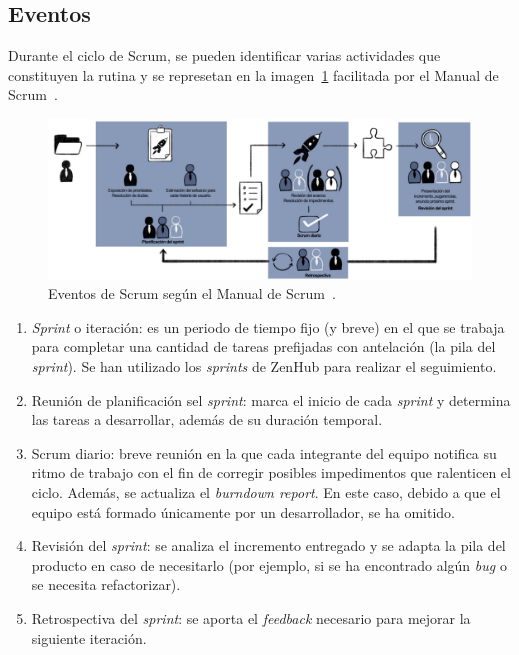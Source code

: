 \subsection{Eventos}
Durante el ciclo de Scrum, se pueden identificar varias actividades que constituyen la rutina y se represetan en la imagen~\ref{img:eventos_scrum} facilitada por el Manual de Scrum~\cite{scrumMaster2022}.

\begin{figure}[h]
	\caption[Eventos de Scrum]{Eventos de Scrum según el Manual de Scrum~\cite{scrumMaster2022}.}
	\label{img:eventos_scrum}
	\centering
	\includegraphics[width=\textwidth]{../img/anexos/scrum/eventos}
\end{figure}

\begin{enumerate}
	\item \textit{Sprint} o iteración: es un periodo de tiempo fijo (y breve) en el que se trabaja para completar una cantidad de tareas prefijadas con antelación (la pila del \textit{sprint}). Se han utilizado los \textit{sprints} de ZenHub para realizar el seguimiento.
	\item Reunión de planificación sel \textit{sprint}: marca el inicio de cada \textit{sprint} y determina las tareas a desarrollar, además de su duración temporal.
	\item Scrum diario: breve reunión en la que cada integrante del equipo notifica su ritmo de trabajo con el fin de corregir posibles impedimentos que ralenticen el ciclo. Además, se actualiza el \textit{burndown report}. En este caso, debido a que el equipo está formado únicamente por un desarrollador, se ha omitido.
	\item Revisión del \textit{sprint}: se analiza el incremento entregado y se adapta la pila del producto en caso de necesitarlo (por ejemplo, si se ha encontrado algún \textit{bug} o se necesita refactorizar).
	\item Retrospectiva del \textit{sprint}: se aporta el \textit{feedback} necesario para mejorar la siguiente iteración.
\end{enumerate}

